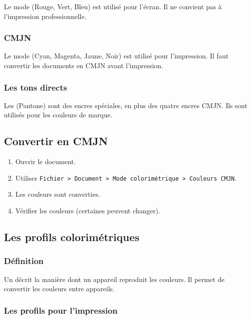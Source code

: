 Le mode  (Rouge, Vert, Bleu) est utilisé pour l'écran. Il ne convient pas à l'impression professionnelle.

\subsubsection{CMJN}

Le mode  (Cyan, Magenta, Jaune, Noir) est utilisé pour l'impression. Il faut convertir les documents en CMJN avant l'impression.

\subsubsection{Les tons directs}

Les  (Pantone) sont des encres spéciales, en plus des quatre encres CMJN. Ils sont utilisés pour les couleurs de marque.

\subsection{Convertir en CMJN}

\begin{enumerate}
    \item Ouvrir le document.
    \item Utiliser \texttt{Fichier > Document > Mode colorimétrique > Couleurs CMJN}.
    \item Les couleurs sont converties.
    \item Vérifier les couleurs (certaines peuvent changer).
\end{enumerate}

\subsection{Les profils colorimétriques}

\subsubsection{Définition}

Un  décrit la manière dont un appareil reproduit les couleurs. Il permet de convertir les couleurs entre appareils.

\subsubsection{Les profils pour l'impression}


